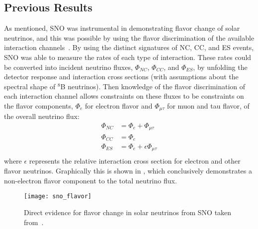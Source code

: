 \subsection{Previous Results}

As mentioned, SNO was instrumental in demonstrating flavor change of solar neutrinos, and this was possible by using the flavor discrimination of the available interaction channels~\cite{sno_direct}.
By using the distinct signatures of NC, CC, and ES events, SNO was able to measure the rates of each type of interaction.
These rates could be converted into incident neutrino fluxes, $\Phi_{NC}$, $\Phi_{CC}$, and $\Phi_{ES}$, by unfolding the detector response and interaction cross sections (with assumptions about the spectral shape of $^8$B neutrinos).
Then knowledge of the flavor discrimination of each interaction channel allows constraints on these fluxes to be constraints on the flavor components, $\Phi_e$ for electron flavor and $\Phi_{\mu\tau}$ for muon and tau flavor, of the overall neutrino flux:
\begin{equation}
\begin{split}
\Phi_{NC} &= \Phi_{e} + \Phi_{\mu\tau} \\
\Phi_{CC} &= \Phi_{e} \\
\Phi_{ES} &= \Phi_{e} + \epsilon \Phi_{\mu\tau} \\
\end{split}
\end{equation}
where $\epsilon$ represents the relative interaction cross section for electron and other flavor neutrinos.
Graphically this is shown in , which conclusively demonstrates a non-electron flavor component to the total neutrino flux.

\begin{figure}
\centering
\texttt{[image: sno\_flavor]}
\caption{\label{fig:sno_flavor} Direct evidence for flavor change in solar neutrinos from SNO taken from~\cite{sno_direct}.}
\end{figure}

